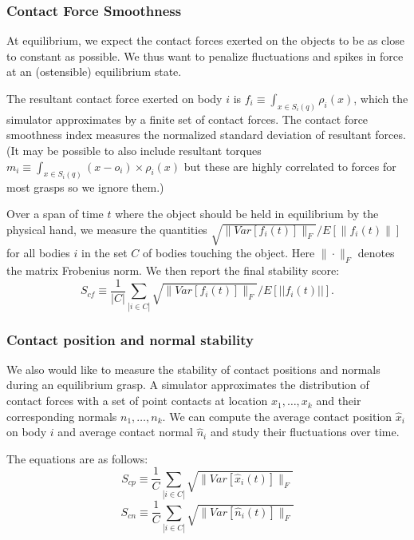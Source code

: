 \subsubsection{Contact Force Smoothness}

At equilibrium, we expect the contact forces exerted on the objects to be as close to constant as possible. We thus want to penalize fluctuations and spikes in force at an (ostensible) equilibrium state. 

The resultant contact force exerted on body $i$  is $f_i \equiv \int_{x\in S_i(q)} \rho_i(x)$, which the simulator approximates by a finite set of contact forces.  The contact force smoothness index measures the normalized standard deviation of resultant forces. (It may be possible to also include resultant torques  $m_i \equiv \int_{x\in S_i(q)} (x-o_i) \times \rho_i(x)$ but these are highly correlated to forces for most grasps so we ignore them.) 

Over a span of time $t$ where the object should be held in equilibrium by the physical hand, we measure the quantities $\sqrt{\|Var[f_i(t)]\|_F} / E[\|f_i(t)\|]$ for all bodies $i$ in the set $C$ of bodies touching the object.  Here $\|\cdot\|_F$ denotes the matrix Frobenius norm. We then report the final stability score:
\begin{equation}
S_{cf} \equiv \frac{1}{|C|} \sum_{|i\in C|} \sqrt{\|Var[f_i(t)]\|_F} / E[||f_i(t)||].
\end{equation}

\subsubsection{Contact position and normal stability}
We also would like to measure the stability of contact positions and normals during an equilibrium grasp.  A simulator approximates the distribution of contact forces with a set of point contacts at location $x_1,\ldots,x_k$ and their corresponding normals $n_1,\ldots,n_k$.  We can compute the average contact position $\hat{x}_i$ on body $i$ and average contact normal $\hat{n}_i$ and study their fluctuations over time.

The equations are as follows:
\begin{equation}
S_{cp} \equiv \frac{1}{C} \sum_{|i\in C|} \sqrt{\|Var[\hat{x}_i(t)]\|_F}
\end{equation}
\begin{equation}
S_{cn} \equiv \frac{1}{C} \sum_{|i\in C|} \sqrt{\|Var[\hat{n}_i(t)]\|_F}
\end{equation}


